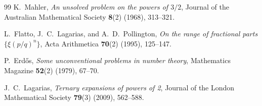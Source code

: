 \documentclass[11pt]{article}
\theoremstyle{definition}
\theoremstyle{remark}
\begin{document}
\begin{thebibliography}{99}
 K.\ Mahler, \emph{An unsolved problem on the powers
  of $3/2$}, Journal of the Australian Mathematical Society
  \textbf{8}(2) (1968), 313--321.

 L.\ Flatto, J.\ C.\ Lagarias,
  and A.\ D.\ Pollington, \emph{On the range of fractional parts
  $\{\xi(p/q)^n\}$}, Acta Arithmetica \textbf{70}(2) (1995), 125--147.

 P.\ Erd\H{o}s, \emph{Some unconventional problems
  in number theory}, Mathematics Magazine \textbf{52}(2) (1979),
  67--70.

 J.\ C.\ Lagarias, \emph{Ternary expansions of
  powers of 2}, Journal of the London Mathematical Society
  \textbf{79}(3) (2009), 562--588.

\end{thebibliography}
\end{document}
